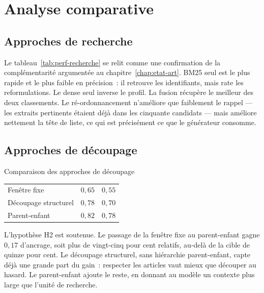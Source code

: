 \section{Analyse comparative}
\label{sec:ch3-comparaison}

\subsection{Approches de recherche}

Le tableau~\ref{tab:perf-recherche} se relit comme une confirmation de la
complémentarité argumentée au chapitre~\ref{chap:etat-art}. BM25 seul est
le plus rapide et le plus faible en précision~: il retrouve les
identifiants, mais rate les reformulations. Le dense seul inverse le
profil. La fusion récupère le meilleur des deux classements. Le
ré-ordonnancement n'améliore que faiblement le rappel --- les extraits
pertinents étaient déjà dans les cinquante candidats --- mais améliore
nettement la tête de liste, ce qui est précisément ce que le générateur
consomme.

\subsection{Approches de découpage}

\begin{btptable}{Comparaison des approches de découpage}
\label{tab:comp-chunking}
\begin{tabularx}{\linewidth}{@{}L{3.8cm} C{3.0cm} C{3.0cm}@{}}
\toprule
{}
 &  &  \\
\midrule
Fenêtre fixe          & $0{,}65$ & $0{,}55$ \\
Découpage structurel  & $0{,}78$ & $0{,}70$ \\
Parent-enfant         & $0{,}82$ & $0{,}78$ \\
\bottomrule
\end{tabularx}
\end{btptable}

L'hypothèse H2 est soutenue. Le passage de la fenêtre fixe au
parent-enfant gagne $0{,}17$ d'ancrage, soit plus de vingt-cinq pour cent
relatifs, au-delà de la cible de quinze pour cent. Le découpage
structurel, sans hiérarchie parent-enfant, capte déjà une grande part du
gain~: respecter les articles vaut mieux que découper au hasard. Le
parent-enfant ajoute le reste, en donnant au modèle un contexte plus
large que l'unité de recherche.

